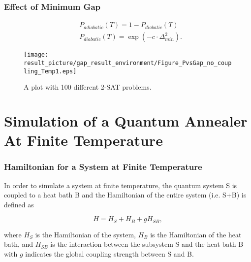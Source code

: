 \documentclass{beamer}
\begin{document}
\begin{frame}
	\frametitle{Effect of Minimum Gap}
		\begin{equation*}
		\begin{split}
		&P_{adiabatic}(T) = 1-P_{diabatic}(T)\\
		&P_{diabatic}(T) = \exp(-c\cdot \Delta_{min}^2).
		\end{split}
		\end{equation*}
	\begin{figure}
		\centering
		\texttt{[image: result\_picture/gap\_result\_environment/Figure\_PvsGap\_no\_coupling\_Temp1.eps]}
		
		 \caption{A plot with 100 different 2-SAT problems.}
	\end{figure}
\end{frame}




\section{Simulation of a Quantum Annealer At Finite Temperature}

\begin{frame}
	\frametitle{Hamiltonian for a System at Finite Temperature}
	In order to simulate a system at finite temperature, the quantum system S is coupled to a heat bath B and the Hamiltonian of the entire system (i.e. S+B) is defined as
	
	\begin{equation*}
	H = H_S + H_B + gH_{SB},
	\end{equation*} 
	
	where $H_S$ is the Hamiltonian of the system, $H_B$ is the Hamiltonian of the heat bath, and $H_{SB}$ is the interaction between the subsystem S and the heat bath B with $g$ indicates the global coupling strength between S and B. 
\end{frame}
\end{document}
